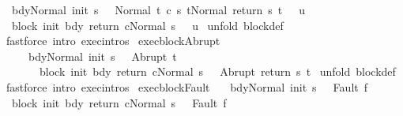 \begin{isabellebody}
\ \ {\isachardoublequoteopen}{\isasymlbrakk}{\isasymGamma}{\isasymturnstile}{\isasymlangle}bdy{\isacharcomma}Normal\ {\isacharparenleft}init\ s{\isacharparenright}{\isasymrangle}\ {\isasymRightarrow}\ \ Normal\ t{\isacharsemicolon}\ {\isasymGamma}{\isasymturnstile}{\isasymlangle}c\ s\ t{\isacharcomma}Normal\ {\isacharparenleft}return\ s\ t{\isacharparenright}{\isasymrangle}\ {\isasymRightarrow}\ \ u{\isasymrbrakk}\isanewline
\ \ {\isasymLongrightarrow}\ \isanewline
\ \ {\isasymGamma}{\isasymturnstile}{\isasymlangle}block\ init\ bdy\ return\ c{\isacharcomma}Normal\ s{\isasymrangle}\ {\isasymRightarrow}\ \ u{\isachardoublequoteclose}\isanewline
%
\isadelimproof
%
\endisadelimproof
%
\isatagproof
{}\isamarkupfalse%
\ {\isacharparenleft}unfold\ block{\isacharunderscore}def{\isacharparenright}\isanewline
{}\isamarkupfalse%
\ {\isacharparenleft}fastforce\ intro{\isacharcolon}\ exec{\isachardot}intros{\isacharparenright}%
\endisatagproof
{\isafoldproof}%
%
\isadelimproof
\isanewline
%
\endisadelimproof
\isanewline
{}\isamarkupfalse%
\ exec{\isacharunderscore}blockAbrupt{\isacharcolon}\ \isanewline
\ \ \ \ \ {\isachardoublequoteopen}{\isasymlbrakk}{\isasymGamma}{\isasymturnstile}{\isasymlangle}bdy{\isacharcomma}Normal\ {\isacharparenleft}init\ s{\isacharparenright}{\isasymrangle}\ {\isasymRightarrow}\ \ Abrupt\ t{\isasymrbrakk}\isanewline
\ \ \ \ \ \ \ {\isasymLongrightarrow}\ \isanewline
\ \ \ \ \ \ \ {\isasymGamma}{\isasymturnstile}{\isasymlangle}block\ init\ bdy\ return\ c{\isacharcomma}Normal\ s{\isasymrangle}\ {\isasymRightarrow}\ \ Abrupt\ {\isacharparenleft}return\ s\ t{\isacharparenright}{\isachardoublequoteclose}\isanewline
%
\isadelimproof
%
\endisadelimproof
%
\isatagproof
{}\isamarkupfalse%
\ {\isacharparenleft}unfold\ block{\isacharunderscore}def{\isacharparenright}\isanewline
{}\isamarkupfalse%
\ {\isacharparenleft}fastforce\ intro{\isacharcolon}\ exec{\isachardot}intros{\isacharparenright}%
\endisatagproof
{\isafoldproof}%
%
\isadelimproof
\isanewline
%
\endisadelimproof
\isanewline
{}\isamarkupfalse%
\ exec{\isacharunderscore}blockFault{\isacharcolon}\ \isanewline
\ \ {\isachardoublequoteopen}{\isasymlbrakk}{\isasymGamma}{\isasymturnstile}{\isasymlangle}bdy{\isacharcomma}Normal\ {\isacharparenleft}init\ s{\isacharparenright}{\isasymrangle}\ {\isasymRightarrow}\ \ Fault\ f{\isasymrbrakk}\isanewline
\ \ \ {\isasymLongrightarrow}\ \isanewline
\ \ {\isasymGamma}{\isasymturnstile}{\isasymlangle}block\ init\ bdy\ return\ c{\isacharcomma}Normal\ s{\isasymrangle}\ {\isasymRightarrow}\ \ Fault\ f{\isachardoublequoteclose}\isanewline

\end{isabellebody}

